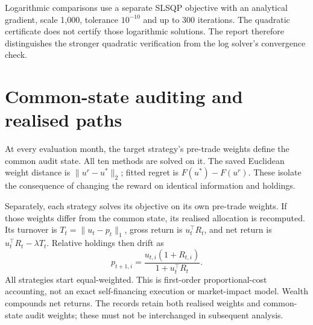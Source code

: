 \documentclass[11pt,a4paper]{article}
\begin{document}
Logarithmic comparisons use a separate SLSQP objective with an analytical gradient, scale 1,000, tolerance $10^{-10}$ and up to 300 iterations. The quadratic certificate does not certify those logarithmic solutions. The report therefore distinguishes the stronger quadratic verification from the log solver's convergence check.

\section{Common-state auditing and realised paths}
At every evaluation month, the target strategy's pre-trade weights define the common audit state. All ten methods are solved on it. The saved Euclidean weight distance is $\|u^r-u^*\|_2$; fitted regret is $F(u^*)-F(u^r)$. These isolate the consequence of changing the reward on identical information and holdings.

Separately, each strategy solves its objective on its own pre-trade weights. If those weights differ from the common state, its realised allocation is recomputed. Its turnover is $T_t=\|u_t-p_t\|_1$, gross return is $u_t^\top R_t$, and net return is $u_t^\top R_t-\lambda T_t$. Relative holdings then drift as
\[
p_{t+1,i}=\frac{u_{t,i}(1+R_{t,i})}{1+u_t^\top R_t}.
\]
All strategies start equal-weighted. This is first-order proportional-cost accounting, not an exact self-financing execution or market-impact model. Wealth compounds net returns. The records retain both realised weights and common-state audit weights; these must not be interchanged in subsequent analysis.
\end{document}
